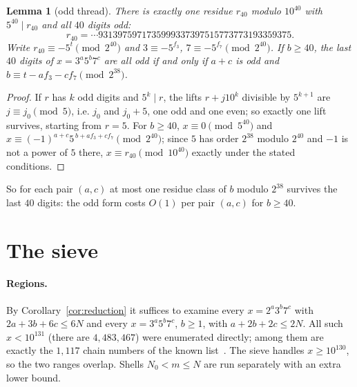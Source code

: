 \documentclass[11pt]{article}
\newtheorem{lemma}[theorem]{Lemma}
\theoremstyle{definition}
\begin{document}
\begin{lemma}[odd thread]\label{lem:L4}
There is exactly one residue $r_{40}$ modulo $10^{40}$ with $5^{40}\mid r_{40}$ and all $40$ digits odd:
\[ r_{40}=\cdots 9313975971735999337397515773773193359375 . \]
Write $r_{40}\equiv -5^{t}\pmod{2^{40}}$ and $3\equiv-5^{f_3}$, $7\equiv-5^{f_7}\pmod{2^{40}}$. If $b\ge40$, the last $40$
digits of $x=3^a5^b7^c$ are all odd if and only if $a+c$ is odd and $b\equiv t-af_3-cf_7\pmod{2^{38}}$.
\end{lemma}

\begin{proof}
If $r$ has $k$ odd digits and $5^k\mid r$, the lifts $r+j10^k$ divisible by $5^{k+1}$ are $j\equiv j_0\pmod5$, i.e.
$j_0$ and $j_0+5$, one odd and one even; so exactly one lift survives, starting from $r=5$. For $b\ge40$,
$x\equiv0\pmod{5^{40}}$ and $x\equiv(-1)^{a+c}5^{\,b+af_3+cf_7}\pmod{2^{40}}$; since $5$ has order $2^{38}$ modulo $2^{40}$
and $-1$ is not a power of $5$ there, $x\equiv r_{40}\pmod{10^{40}}$ exactly under the stated conditions.
\end{proof}

So for each pair $(a,c)$ at most one residue class of $b$ modulo $2^{38}$ survives the last $40$ digits: the odd
form costs $O(1)$ per pair $(a,c)$ for $b\ge40$.

\section{The sieve}\label{sec:sieve}

\paragraph{Regions.} By Corollary~\ref{cor:reduction} it suffices to examine every $x=2^a3^b7^c$ with $2a+3b+6c\le6N$
and every $x=3^a5^b7^c$, $b\ge1$, with $a+2b+2c\le 2N$. All such $x<10^{131}$ (there are $4{,}483{,}467$) were enumerated
directly; among them are exactly the $1{,}117$ chain numbers of the known list~\cite{repo}. The sieve handles
$x\ge10^{130}$, so the two ranges overlap. Shells $N_0<m\le N$ are run separately with an extra lower bound.
\end{document}
